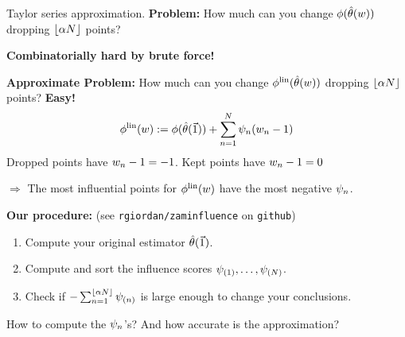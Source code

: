 \begin{frame}{Taylor series approximation.}
%
\textbf{Problem: }
%
How much can you change $\phi(\hat{\theta}(w))$
dropping $\lfloor \alpha N \rfloor$ points?

\textbf{Combinatorially hard by brute force!}

\hrulefill

\pause
\textbf{Approximate Problem: }
%
How much can you change $\phi^{\mathrm{lin}}(\hat{\theta}(w))$
dropping $\lfloor \alpha N \rfloor$ points?
%
\textbf{Easy! }
%
\begin{align*}
    \phi^{\mathrm{lin}}(w)
		:=  \phi(\hat{\theta}(\vec{1})) +
        \sum_{n=1}^N \psi_n (w_n -1)
\end{align*}
%
Dropped points have $w_n - 1 = -1$.  Kept points have $w_n - 1 = 0$

$\Rightarrow$ The most influential points for $\phi^{\mathrm{lin}}(w)$ have the
most negative $\psi_n$.

\hrulefill

\pause
\textbf{Our procedure:}  (see \texttt{rgiordan/zaminfluence} on \texttt{github})
\begin{enumerate}
    \item Compute your original estimator $\hat{\theta}(\vec{1})$.
    \item Compute and sort the influence scores
        $\psi_{(1)}, \ldots, \psi_{(N)}$.
    \item Check if $- \sum_{n=1}^{\lfloor \alpha N \rfloor} \psi_{(n)}$ is large
    enough to change your conclusions.
\end{enumerate}

\pause
How to compute the $\psi_n$'s?  And how accurate is the approximation?

\end{frame}


